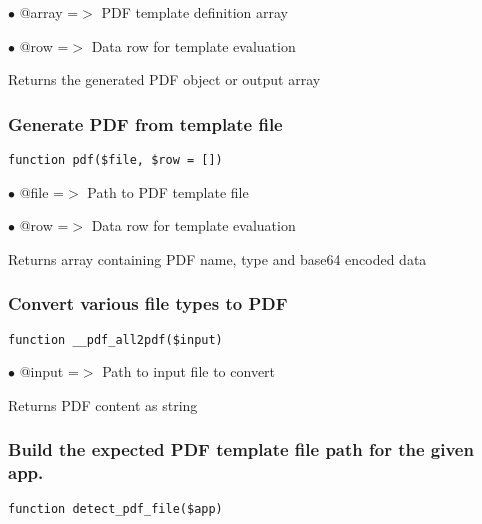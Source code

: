 \documentclass[a4paper]{article}
\begin{document}
\begin{compactitem}
\item[\color{myblue}$\bullet$] @array =$>$ PDF template definition array
\item[\color{myblue}$\bullet$] @row   =$>$ Data row for template evaluation
\end{compactitem}

Returns the generated PDF object or output array

\hypertarget{toc514}{}
\subsubsection{Generate PDF from template file}

\begin{lstlisting}
function pdf($file, $row = [])
\end{lstlisting}

\begin{compactitem}
\item[\color{myblue}$\bullet$] @file =$>$ Path to PDF template file
\item[\color{myblue}$\bullet$] @row  =$>$ Data row for template evaluation
\end{compactitem}

Returns array containing PDF name, type and base64 encoded data

\hypertarget{toc515}{}
\subsubsection{Convert various file types to PDF}

\begin{lstlisting}
function __pdf_all2pdf($input)
\end{lstlisting}

\begin{compactitem}
\item[\color{myblue}$\bullet$] @input =$>$ Path to input file to convert
\end{compactitem}

Returns PDF content as string

\hypertarget{toc516}{}
\subsubsection{Build the expected PDF template file path for the given app.}

\begin{lstlisting}
function detect_pdf_file($app)
\end{lstlisting}
\end{document}
